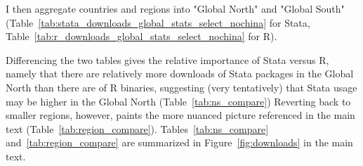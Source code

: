 \documentclass{Revue-economique}
\begin{document}
\begin{Article} [%
	Titre={Reproducibility and Open Science in Economics},
	Auteur={Lars Vilhuber\thanks{Cornell University, lars.vilhuber@cornell.edu}}]
\begin{refsection}[Main]
\begin{appendices}
I then aggregate countries and regions into "Global North" and "Global South" (Table~\ref{tab:stata_downloads_global_stats_select_nochina} for Stata, Table~\ref{tab:r_downloads_global_stats_select_nochina} for R). 
%
%


%
%
Differencing the two tables  gives the relative importance of Stata versus R, namely that there are relatively more downloads of Stata packages in the Global North than there are of R binaries, suggesting (very tentatively) that Stata usage may be higher in the Global North (Table~\ref{tab:ns_compare})
Reverting back to smaller regions, however, paints the more nuanced picture referenced in the main text (Table~\ref{tab:region_compare}). Tables~\ref{tab:ns_compare} and~\ref{tab:region_compare} are summarized in Figure~\ref{fig:downloads} in the main text.




\end{appendices}

\sloppy
\printbibliography %
\end{refsection}

\end{Article}
\end{document}
